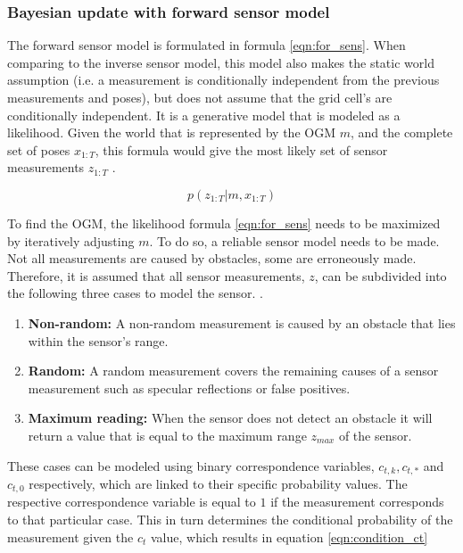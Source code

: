 \subsubsection{Bayesian update with forward sensor model}
The forward sensor model is formulated in formula \ref{eqn:for_sens}. When comparing to the inverse sensor model, this model also makes the static world assumption (i.e. a measurement is conditionally independent from the previous measurements and poses), but does not assume that the grid cell's are conditionally independent. It is a generative model that is modeled as a likelihood. Given the world that is represented by the \gls{OGM} $m$, and the complete set of poses $x_{1:T}$, this formula would give the most likely set of sensor measurements $z_{1:T}$ \cite{carvalho2013comparative}.

\begin{equation} \label{eqn:for_sens}
	p(z_{1:T}|m,x_{1:T})
\end{equation}

To find the \gls{OGM}, the likelihood formula \ref{eqn:for_sens} needs to be maximized by iteratively adjusting $m$. To do so, a reliable sensor model needs to be made.
Not all measurements are caused by obstacles, some are erroneously made. Therefore, it is assumed that all sensor measurements, $z$, can be subdivided into the following three cases to model the sensor. \cite{thrun2003learning} \cite{carvalho2013comparative}.  

\begin{enumerate}
	\item \textbf{Non-random:} A non-random measurement is caused by an obstacle that lies within the sensor's range.
	\item \textbf{Random:} A random measurement covers the remaining causes of a sensor measurement such as specular reflections or false positives.
	\item \textbf{Maximum reading:} When the sensor does not detect an obstacle it will return a value that is equal to the maximum range $z_{max}$ of the sensor.
\end{enumerate}

These cases can be modeled using binary correspondence variables, $c_{t,k}, c_{t,*}$ and $c_{t,0}$ respectively, which are linked to their specific probability values. The respective correspondence variable is equal to $1$ if the measurement corresponds to that particular case. This in turn determines the conditional probability of the measurement given the $c_t$ value, which results in equation \ref{eqn:condition_ct} \cite{thrun2003learning} \cite{carvalho2013comparative}

